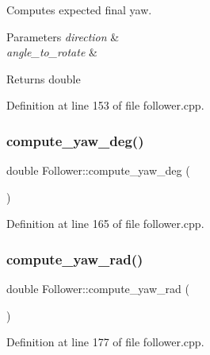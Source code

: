 Computes expected final yaw. 


\begin{DoxyParams}{Parameters}
{\em direction} & \\
\hline
{\em angle\+\_\+to\+\_\+rotate} & \\
\hline
\end{DoxyParams}
\begin{DoxyReturn}{Returns}
double 
\end{DoxyReturn}


Definition at line 153 of file follower.\+cpp.

\mbox{\label{class_follower_ac988cad87474cb64ef3be7fe197d90a7}} 
\subsubsection{\texorpdfstring{compute\+\_\+yaw\+\_\+deg()}{compute\_yaw\_deg()}}
{\footnotesize\ttfamily double Follower\+::compute\+\_\+yaw\+\_\+deg (\begin{DoxyParamCaption}{ }\end{DoxyParamCaption})}



Definition at line 165 of file follower.\+cpp.

\mbox{\label{class_follower_abde593631e6549062d77fb2169a17c66}} 
\subsubsection{\texorpdfstring{compute\+\_\+yaw\+\_\+rad()}{compute\_yaw\_rad()}}
{\footnotesize\ttfamily double Follower\+::compute\+\_\+yaw\+\_\+rad (\begin{DoxyParamCaption}{ }\end{DoxyParamCaption})}



Definition at line 177 of file follower.\+cpp.

\mbox{\label{class_follower_a670f07466502e1020514d6ba6b928553}} 
